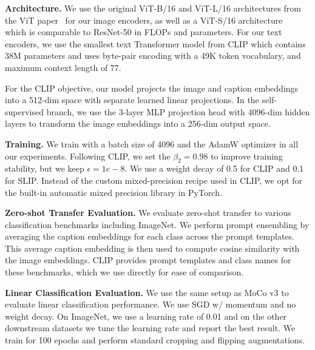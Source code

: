 \documentclass[10pt,twocolumn,letterpaper]{article}
\renewcommand{\paragraph}[1]{\vspace{1.25mm}\noindent\textbf{#1}}
\begin{document}
\paragraph{Architecture.} We use the original ViT-B/16 and ViT-L/16 architectures from the ViT paper~\cite{Dosovitskiy2021AnII} for our image encoders, as well as a ViT-S/16 architecture~\cite{Touvron2021TrainingDI} which is comparable to ResNet-50 in FLOPs and parameters.
For our text encoders, we use the smallest text Transformer model from CLIP which contains 38M parameters and uses byte-pair encoding with a 49K token vocabulary, and maximum context length of 77.

For the CLIP objective, our model projects the image and caption embeddings into a 512-dim space with separate learned linear projections.
In the self-supervised branch, we use the 3-layer MLP projection head with 4096-dim hidden layers to transform the image embeddings into a 256-dim output space.

\paragraph{Training.} We train with a batch size of 4096 and the AdamW optimizer in all our experiments.
Following CLIP, we set the $\beta_2=0.98$ to improve training stability, but we keep $\epsilon=1e-8$. 
We use a weight decay of 0.5 for CLIP and 0.1 for SLIP.
Instead of the custom mixed-precision recipe used in CLIP, we opt for the built-in automatic mixed precision library in PyTorch.

\paragraph{Zero-shot Transfer Evaluation.} We evaluate zero-shot transfer to various classification benchmarks including ImageNet.
We perform prompt ensembling by averaging the caption embeddings for each class across the prompt templates.
This average caption embedding is then used to compute cosine similarity with the image embeddings.
CLIP provides prompt templates and class names for these benchmarks, which we use directly for ease of comparison.

\paragraph{Linear Classification Evaluation.} We use the same setup as MoCo v3 to evaluate linear classification performance.
We use SGD w/ momentum and no weight decay.
On ImageNet, we use a learning rate of 0.01 and on the other downstream datasets we tune the learning rate and report the best result.
We train for 100 epochs and perform standard cropping and flipping augmentations.
\end{document}
